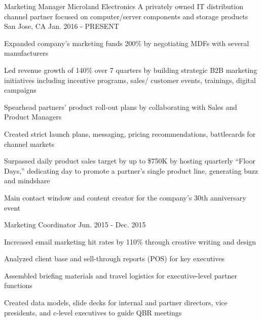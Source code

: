 

\begin{cventries}

  \cventry
    {Marketing Manager} %
    {Microland Electronics \newline \textnormal{A privately owned IT distribution channel partner focused on computer/server components and storage products}} %
    {San Jose, CA} %
    {Jan. 2016 - PRESENT} %
    {
      \begin{cvitems} %
               \item {Expanded company’s marketing funds 200\% by negotiating MDFs with several manufacturers}
       \item {Led revenue growth of 140\% over 7 quarters by building strategic B2B marketing initiatives \newline including incentive programs, sales/ customer events, trainings, digital campaigns}
        \item {Spearhead partners’ product roll-out plans by collaborating with Sales and Product Managers}
        \item {Created strict launch plans, messaging, pricing recommendations, battlecards for channel markets}
        \item {Surpassed daily product sales target by up to \$750K by hosting quarterly “Floor Days,” dedicating  day to promote a partner’s single product line, generating buzz and mindshare}
        \item {Main contact window and content creator for the company’s 30th anniversary event}
      \end{cvitems}
    }

  \cventry
    {Marketing Coordinator} %
    {} %
    {} %
    {Jun. 2015 - Dec. 2015} %
    {
      \begin{cvitems} %
        \item {Increased email marketing hit rates by 110\% through creative writing and design}
        \item {Analyzed client base and sell-through reports (POS) for key executives}
        \item {Assembled briefing materials and travel logistics for executive-level partner functions}
                \item {Created data models, slide decks for internal and partner directors, vice presidents, and \newline c-level executives to guide QBR meetings}
      \end{cvitems}
    }

  
\end{cventries}
